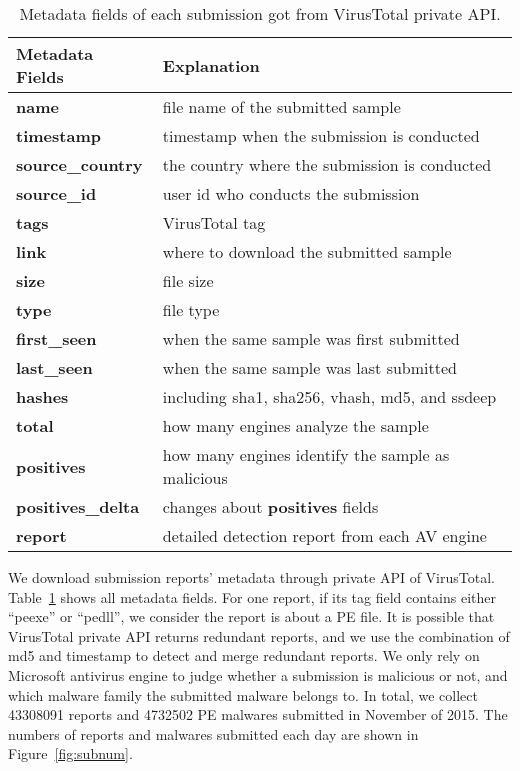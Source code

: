 
\begin{table}[h!]
\centering
\footnotesize
{
\begin{tabular}{l|l}
\hline
Metadata Fields & Explanation \\
\hline                            
{\bf name}      & file name of the submitted sample \\
{\bf timestamp} & timestamp when the submission is conducted \\
{\bf source\_country} & the country where the submission is conducted \\
{\bf source\_id} & user id who conducts the submission\\
{\bf tags} & VirusTotal tag \\
{\bf link} & where to download the submitted sample \\
{\bf size} & file size \\
{\bf type} & file type \\
{\bf first\_seen} & when the same sample was first submitted \\
{\bf last\_seen} & when the same sample was last submitted \\
{\bf hashes} & including sha1, sha256, vhash, md5, and ssdeep\\
{\bf total} & how many engines analyze the sample\\
{\bf positives} & how many engines identify the sample as malicious \\
{\bf positives\_delta} & changes about {\bf positives} fields \\
{\bf report} & detailed detection report from each AV engine \\
\hline

\end{tabular}
}
\caption{Metadata fields of each submission got from VirusTotal private API.}
\label{tab:fields}
\end{table}

We download submission reports' metadata through private API of VirusTotal.
Table~\ref{tab:fields} shows all metadata fields.
For one report, if its tag field contains either ``peexe'' or ``pedll'', 
we consider the report is about a PE file. 
It is possible that VirusTotal private API returns redundant reports, 
and we use the combination of md5 and timestamp to detect and merge redundant reports.
We only rely on Microsoft antivirus engine to judge whether a submission is malicious or not, 
and which malware family the submitted malware belongs to. 
In total, we collect 43308091 reports and 4732502 PE malwares submitted
in November of 2015. 
The numbers of reports and malwares submitted each day are shown in Figure~\ref{fig:subnum}.

